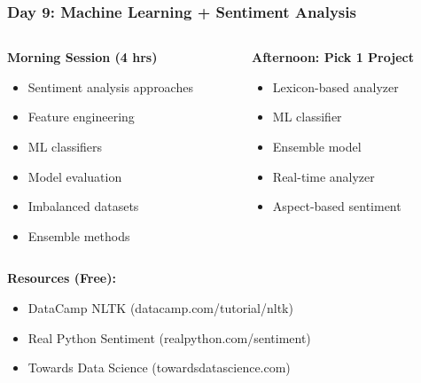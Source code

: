 \begin{frame}[fragile]\frametitle{Day 9: Machine Learning + Sentiment Analysis}
\begin{columns}
    \begin{column}[T]{0.5\linewidth}
      \textbf{Morning Session (4 hrs)}
      \begin{itemize}
        \item Sentiment analysis approaches
        \item Feature engineering
        \item ML classifiers
        \item Model evaluation
        \item Imbalanced datasets
        \item Ensemble methods
      \end{itemize}
    \end{column}
    \begin{column}[T]{0.5\linewidth}
      \textbf{Afternoon: Pick 1 Project}
      \begin{itemize}
        \item Lexicon-based analyzer
        \item ML classifier
        \item Ensemble model
        \item Real-time analyzer
        \item Aspect-based sentiment
      \end{itemize}
    \end{column}
  \end{columns}
  
  \vspace{0.3cm}
  \textbf{Resources (Free):}
  \begin{itemize}
    \item DataCamp NLTK (datacamp.com/tutorial/nltk)
    \item Real Python Sentiment (realpython.com/sentiment)
    \item Towards Data Science (towardsdatascience.com)
  \end{itemize}
\end{frame}


